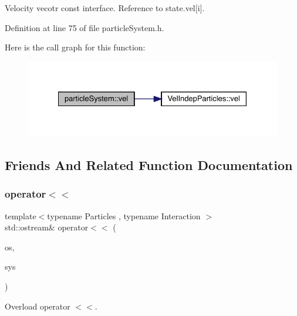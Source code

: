 Velocity vecotr const interface. Reference to state.\+vel\mbox{[}i\mbox{]}. 



Definition at line 75 of file particle\+System.\+h.

Here is the call graph for this function\+:\nopagebreak
\begin{figure}[H]
\begin{center}
\leavevmode
\includegraphics[width=328pt]{classparticle_system_a2557b0120e0e892da7e8903551784157_cgraph}
\end{center}
\end{figure}


\subsection{Friends And Related Function Documentation}
\mbox{\label{classparticle_system_a58e2c35978a7eb211e7206a05855b331}} 
\subsubsection{\texorpdfstring{operator$<$$<$}{operator<<}\hspace{0.1cm}{\footnotesize\ttfamily [1/2]}}
{\footnotesize\ttfamily template$<$typename Particles , typename Interaction $>$ \\
std\+::ostream\& operator$<$$<$ (\begin{DoxyParamCaption}\item[{std\+::ostream \&}]{os,  }\item[{const \mbox{\hyperlink{classparticle_system}{particle\+System}}$<$ \mbox{\hyperlink{struct_particles}{Particles}}, Interaction $>$ \&}]{sys }\end{DoxyParamCaption})\hspace{0.3cm}{\ttfamily [friend]}}



Overload operator $<$$<$. 



